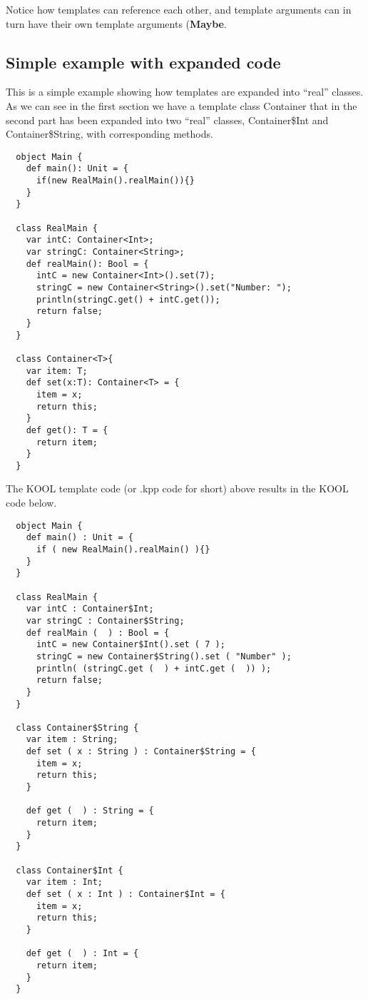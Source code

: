 Notice how templates can reference each other, and template arguments can in
turn have their own template arguments (\textbf{Maybe}.


\subsection{Simple example with expanded code}

This is a simple example showing how templates are expanded into ``real''
classes. As we can see in the first section we have a template class
Container that in the second part has been expanded into two ``real''
classes, Container\$Int and Container\$String, with corresponding methods.

\begin{lstlisting}
  object Main {
    def main(): Unit = {
      if(new RealMain().realMain()){}
    }
  }

  class RealMain {
    var intC: Container<Int>;
    var stringC: Container<String>;
    def realMain(): Bool = {
      intC = new Container<Int>().set(7);
      stringC = new Container<String>().set("Number: ");
      println(stringC.get() + intC.get());
      return false;
    }
  }

  class Container<T>{
    var item: T;
    def set(x:T): Container<T> = {
      item = x;
      return this;
    }
    def get(): T = {
      return item;
    }
  }

\end{lstlisting}

The KOOL template code (or .kpp code for short) above results in the
KOOL code below.

\begin{lstlisting}
  object Main {
    def main() : Unit = {
      if ( new RealMain().realMain() ){}
    }
  }

  class RealMain {
    var intC : Container$Int;
    var stringC : Container$String;
    def realMain (  ) : Bool = {
      intC = new Container$Int().set ( 7 );
      stringC = new Container$String().set ( "Number" );
      println( (stringC.get (  ) + intC.get (  )) );
      return false;
    }
  }

  class Container$String {
    var item : String;
    def set ( x : String ) : Container$String = {
      item = x;
      return this;
    }

    def get (  ) : String = {
      return item;
    }
  }

  class Container$Int {
    var item : Int;
    def set ( x : Int ) : Container$Int = {
      item = x;
      return this;
    }

    def get (  ) : Int = {
      return item;
    }
  }

\end{lstlisting}
